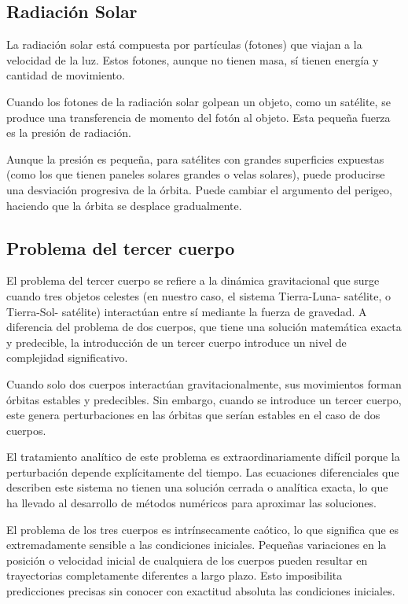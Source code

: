 \subsection{Radiación Solar}

La radiación solar está compuesta por partículas (fotones) que viajan a la velocidad de la luz. Estos fotones, aunque no tienen masa, sí tienen energía y cantidad de movimiento. 

Cuando los fotones de la radiación solar golpean un objeto, como un satélite, se produce una transferencia de momento del fotón al objeto. Esta pequeña fuerza es la presión de radiación.

Aunque la presión es pequeña, para satélites con grandes superficies expuestas (como los que tienen paneles solares grandes o velas solares), puede producirse una desviación progresiva de la órbita. Puede cambiar el argumento del perigeo, haciendo que la órbita se desplace gradualmente.


\subsection{Problema del tercer cuerpo}

El problema del tercer cuerpo se refiere a la dinámica gravitacional que surge cuando tres objetos celestes (en nuestro caso, el sistema Tierra-Luna- satélite, o Tierra-Sol- satélite) interactúan entre sí mediante la fuerza de gravedad. A diferencia del problema de dos cuerpos, que tiene una solución matemática exacta y predecible, la introducción de un tercer cuerpo introduce un nivel de complejidad significativo.

Cuando solo dos cuerpos interactúan gravitacionalmente, sus movimientos forman órbitas estables y predecibles. Sin embargo, cuando se introduce un tercer cuerpo, este genera perturbaciones en las órbitas que serían estables en el caso de dos cuerpos.

El tratamiento analítico de este problema es extraordinariamente difícil porque la perturbación depende explícitamente del tiempo. Las ecuaciones diferenciales que describen este sistema no tienen una solución cerrada o analítica exacta, lo que ha llevado al desarrollo de métodos numéricos para aproximar las soluciones.

El problema de los tres cuerpos es intrínsecamente caótico, lo que significa que es extremadamente sensible a las condiciones iniciales. Pequeñas variaciones en la posición o velocidad inicial de cualquiera de los cuerpos pueden resultar en trayectorias completamente diferentes a largo plazo. Esto imposibilita predicciones precisas sin conocer con exactitud absoluta las condiciones iniciales.\\

